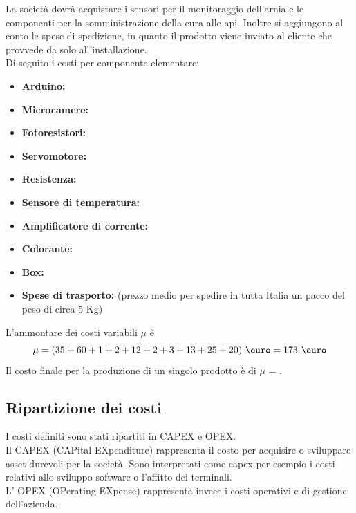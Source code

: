 La società dovrà acquistare i sensori per il monitoraggio dell’arnia e le
componenti per la somministrazione della cura alle api. Inoltre si aggiungono al
conto le spese di spedizione, in quanto il prodotto viene inviato al cliente che
provvede da solo all’installazione.\\
%
Di seguito i costi per componente elementare:
\begin{itemize}
\item \textbf{Arduino: }
\item \textbf{Microcamere: }
\item \textbf{Fotoresistori: }
\item \textbf{Servomotore: }
\item \textbf{Resistenza: }
\item \textbf{Sensore di temperatura: }
\item \textbf{Amplificatore di corrente: }
\item \textbf{Colorante: }
\item \textbf{Box: }
\item \textbf{Spese di trasporto: } (prezzo medio per spedire in tutta
Italia un pacco del peso di circa 5 Kg)
\end{itemize}
L’ammontare dei costi variabili $\mu$ è
\begin{displaymath}
\mu= (35 + 60 + 1 + 2 + 12 + 2 + 3 + 13 + 25 + 20) \ \mbox{\euro} = 173
\ \mbox{\euro}
\end{displaymath}
Il costo finale per la produzione di un singolo prodotto è di $\mu$ = .
\subsection{Ripartizione dei costi}
I costi definiti sono stati ripartiti in CAPEX e OPEX.\\
Il CAPEX (CAPital EXpenditure) rappresenta il costo per acquisire o sviluppare
asset durevoli per la società. Sono interpretati come capex per esempio i costi
relativi allo sviluppo software o l’affitto dei terminali.\\
L’ OPEX (OPerating EXpense) rappresenta invece i costi operativi e di gestione
dell’azienda.

